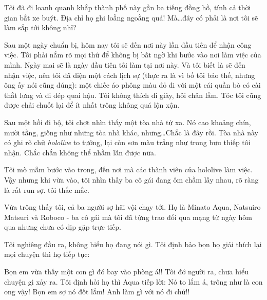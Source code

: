 \documentclass[../main.tex]{subfiles}
\begin{document}
\omk


Tôi đã đi loanh quanh khắp thành phố này gần ba tiếng đồng hồ, tính cả thời gian bắt xe buýt. Địa chỉ họ ghi loằng ngoằng quá! Mà\ldots đây có phải là nơi tôi sẽ làm sắp tới không nhỉ? 

Sau một ngày chuẩn bị, hôm nay tôi sẽ đến nơi này lần đầu tiên để nhận công việc. Tôi phải nắm rõ mọi thứ để không bị bất ngờ khi bước vào nơi làm việc của mình. Ngày mai sẽ là ngày đầu tiên tôi làm tại nơi này. Và tôi biết là sẽ đến nhận việc, nên tôi đã diện một cách lịch sự (thực ra là vì bố tôi bảo thế, nhưng ông ấy nói cũng đúng): một chiếc áo phông màu đỏ đi với một cái quần bò có cài thắt lưng và đi dép quai hậu. Tôi không thích đi giày, hôi chân lắm. Tóc tôi cũng được chải chuốt lại để ít nhất trông không quá lộn xộn.

Sau một hồi đi bộ, tôi chợt nhìn thấy một tòa nhà từ xa. Nó cao khoảng chín, mười tầng, giống như những tòa nhà khác, nhưng\ldots Chắc là đây rồi. Tòa nhà này có ghi rõ chữ \textit{hololive} to tướng, lại còn sơn màu trắng như trong bưu thiếp tôi nhận. Chắc chắn không thể nhầm lẫn được nữa.

\ct

Tôi mò mẫm bước vào trong, đến nơi mà các thành viên của hololive làm việc. Vậy nhưng khi vừa vào, tôi nhìn thấy ba cô gái đang ôm chầm lấy nhau, rõ ràng là rất run sợ.  tôi thắc mắc. 

Vừa trông thấy tôi, cả ba người sợ hãi vội chạy tới. Họ là Minato Aqua, Natsuiro Matsuri và Roboco - ba cô gái mà tôi đã từng trao đổi qua mạng từ ngày hôm qua nhưng chưa có dịp gặp trực tiếp.

\begin{dialogue} 
     
      
      
\end{dialogue}

Tôi nghiêng đầu ra, không hiểu họ đang nói gì. Tôi định bảo bọn họ giải thích lại mọi chuyện thì họ tiếp tục:

\begin{dialogue}
 Bọn em vừa thấy một con gì đó bay vào phòng á!!
 Tôi đớ người ra, chưa hiểu chuyện gì xảy ra. Tôi định hỏi họ thì Aqua tiếp lời:
 Nó to lắm á, trông như là con ong vậy!
 Bọn em sợ nó đốt lắm!
 Anh làm gì với nó đi chứ!!
\end{dialogue}
\end{document}
